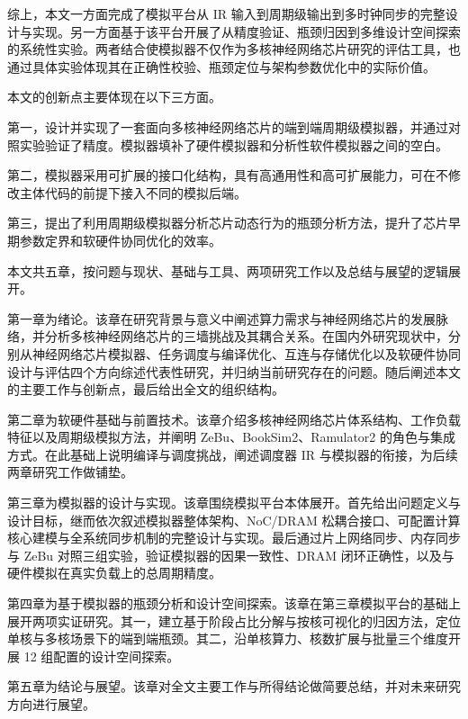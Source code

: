 综上，本文一方面完成了模拟平台从 IR 输入到周期级输出到多时钟同步的完整设计与实现。另一方面基于该平台开展了从精度验证、瓶颈归因到多维设计空间探索的系统性实验。两者结合使模拟器不仅作为多核神经网络芯片研究的评估工具，也通过具体实验体现其在正确性校验、瓶颈定位与架构参数优化中的实际价值。


本文的创新点主要体现在以下三方面。

第一，设计并实现了一套面向多核神经网络芯片的端到端周期级模拟器，并通过对照实验验证了精度。模拟器填补了硬件模拟器和分析性软件模拟器之间的空白。

第二，模拟器采用可扩展的接口化结构，具有高通用性和高可扩展能力，可在不修改主体代码的前提下接入不同的模拟后端。

第三，提出了利用周期级模拟器分析芯片动态行为的瓶颈分析方法，提升了芯片早期参数定界和软硬件协同优化的效率。


本文共五章，按问题与现状、基础与工具、两项研究工作以及总结与展望的逻辑展开。

第一章为绪论。该章在研究背景与意义中阐述算力需求与神经网络芯片的发展脉络，并分析多核神经网络芯片的三墙挑战及其耦合关系。在国内外研究现状中，分别从神经网络芯片模拟器、任务调度与编译优化、互连与存储优化以及软硬件协同设计与评估四个方向综述代表性研究，并归纳当前研究存在的问题。随后阐述本文的主要工作与创新点，最后给出全文的组织结构。

第二章为软硬件基础与前置技术。该章介绍多核神经网络芯片体系结构、工作负载特征以及周期级模拟方法，并阐明 ZeBu、BookSim2、Ramulator2 的角色与集成方式。在此基础上说明编译与调度挑战，阐述调度器 IR 与模拟器的衔接，为后续两章研究工作做铺垫。

第三章为模拟器的设计与实现。该章围绕模拟平台本体展开。首先给出问题定义与设计目标，继而依次叙述模拟器整体架构、NoC/DRAM 松耦合接口、可配置计算核心建模与全系统同步机制的完整设计与实现。最后通过片上网络同步、内存同步与 ZeBu 对照三组实验，验证模拟器的因果一致性、DRAM 闭环正确性，以及与硬件模拟在真实负载上的总周期精度。

第四章为基于模拟器的瓶颈分析和设计空间探索。该章在第三章模拟平台的基础上展开两项实证研究。其一，建立基于阶段占比分解与按核可视化的归因方法，定位单核与多核场景下的端到端瓶颈。其二，沿单核算力、核数扩展与批量三个维度开展 12 组配置的设计空间探索。

第五章为结论与展望。该章对全文主要工作与所得结论做简要总结，并对未来研究方向进行展望。
